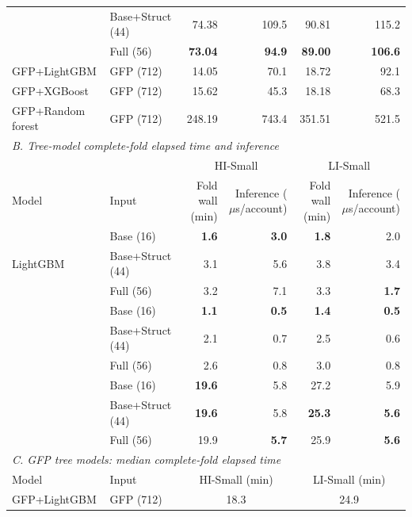 \begin{table}[p]
\begin{threeparttable}
\begin{tabular}{llrrrr}
 & Base+Struct (44) & 74.38 & 109.5 & 90.81 & 115.2 \\
 & Full (56) & \textbf{73.04} & \textbf{94.9} & \textbf{89.00} & \textbf{106.6} \\
\addlinespace[3pt]
GFP+LightGBM\tnote{c} & GFP (712) & 14.05 & 70.1 & 18.72 & 92.1 \\
GFP+XGBoost\tnote{c} & GFP (712) & 15.62 & 45.3 & 18.18 & 68.3 \\
GFP+Random forest\tnote{c} & GFP (712) & 248.19 & 743.4 & 351.51 & 521.5 \\
\midrule
\multicolumn{6}{l}{\textit{B. Tree-model complete-fold elapsed time and inference}} \\
\midrule
& & \multicolumn{2}{c}{HI-Small} & \multicolumn{2}{c}{LI-Small} \\
\cmidrule(lr){3-4}\cmidrule(lr){5-6}
Model & Input & \shortstack{Fold wall\\(min)} & \shortstack{Inference\\($\mu$s/account)} & \shortstack{Fold wall\\(min)} & \shortstack{Inference\\($\mu$s/account)} \\
\midrule
\multirow{3}{*}{LightGBM\tnote{a}} & Base (16) & \textbf{1.6} & \textbf{3.0} & \textbf{1.8} & 2.0 \\
 & Base+Struct (44) & 3.1 & 5.6 & 3.8 & 3.4 \\
 & Full (56) & 3.2 & 7.1 & 3.3 & \textbf{1.7} \\
\addlinespace[3pt]
\multirow{3}{*}{XGBoost\tnote{a}} & Base (16) & \textbf{1.1} & \textbf{0.5} & \textbf{1.4} & \textbf{0.5} \\
 & Base+Struct (44) & 2.1 & 0.7 & 2.5 & 0.6 \\
 & Full (56) & 2.6 & 0.8 & 3.0 & 0.8 \\
\addlinespace[3pt]
\multirow{3}{*}{Random forest\tnote{a}} & Base (16) & \textbf{19.6} & 5.8 & 27.2 & 5.9 \\
 & Base+Struct (44) & \textbf{19.6} & 5.8 & \textbf{25.3} & \textbf{5.6} \\
 & Full (56) & 19.9 & \textbf{5.7} & 25.9 & \textbf{5.6} \\
\midrule
\multicolumn{6}{l}{\textit{C. GFP tree models\tnote{c}: median complete-fold elapsed time}} \\
\midrule
Model & Input & \multicolumn{2}{c}{HI-Small (min)} & \multicolumn{2}{c}{LI-Small (min)} \\
GFP+LightGBM & GFP (712) & \multicolumn{2}{c}{18.3} & \multicolumn{2}{c}{24.9} \\

\end{tabular}
\end{threeparttable}
\end{table}
